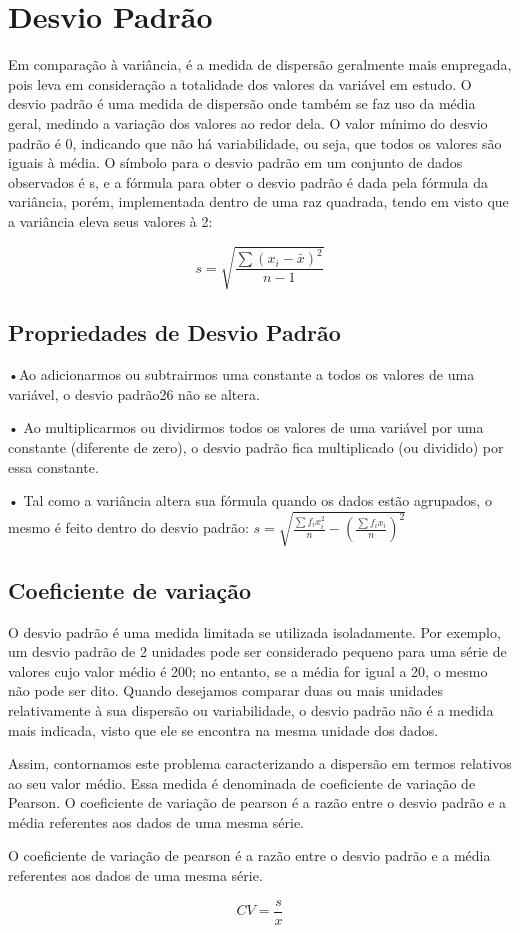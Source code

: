 \section{Desvio Padrão}
Em comparação à variância, é a medida de dispersão geralmente mais empregada, pois leva em consideração a totalidade dos valores da variável em estudo. O desvio padrão é uma medida de dispersão onde também se faz uso da média geral, medindo a variação dos valores ao redor dela. O valor mínimo do desvio padrão é 0, indicando que não há variabilidade, ou seja, que todos os valores são iguais à média. O símbolo para o desvio padrão em um conjunto de dados observados é s, e a fórmula para obter o desvio padrão é dada pela fórmula da variância, porém, implementada dentro de uma raz quadrada, tendo em visto que a variância eleva seus valores à 2:

\begin{equation}
    s = \sqrt{\frac{\sum (x_i - \bar{x})^2}{n - 1}}
    \label{eq:desvio_padrao}
\end{equation}

\subsection{Propriedades de Desvio Padrão}
•Ao adicionarmos ou subtrairmos uma constante a todos os valores de
uma variável, o desvio padrão26 não se altera.

• Ao multiplicarmos ou dividirmos todos os valores de uma variável por uma
constante (diferente de zero), o desvio padrão fica multiplicado (ou dividido) por essa constante.

• Tal como a variância altera sua fórmula quando os dados estão agrupados, o mesmo é feito dentro do desvio padrão:
\(s = \sqrt{\frac{\sum f_i x_i^2}{n} - {(\frac{\sum f_i x_i}{n})^2}}\)

\subsection{Coeficiente de variação}
O desvio padrão é uma medida limitada se utilizada isoladamente. Por exemplo, um desvio padrão de 2 unidades pode ser considerado pequeno para uma série de valores cujo valor médio é 200; no entanto, se a média for igual a 20, o mesmo não pode ser dito.
Quando desejamos comparar duas ou mais unidades relativamente à
sua dispersão ou variabilidade, o desvio padrão não é a medida mais indicada, visto que ele se encontra na mesma unidade dos dados.

Assim, contornamos este problema caracterizando a dispersão em termos relativos ao seu valor médio. Essa medida é denominada de coeficiente de variação de Pearson. O coeficiente de variação de pearson é a razão entre o desvio padrão e a média referentes aos dados de uma mesma série.

O coeficiente de variação de pearson é a razão entre o desvio padrão e a média referentes aos dados de uma mesma série.

\[CV = \frac{s}{x}\]
